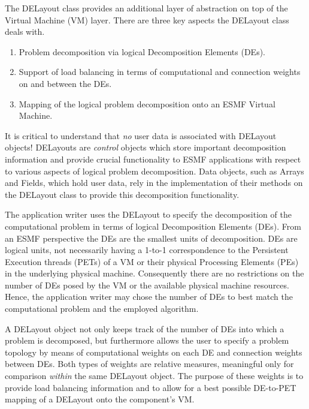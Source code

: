 
The DELayout class provides an additional layer of abstraction on top of the
Virtual Machine (VM) layer. There are three key aspects the DELayout class deals
with.

\begin{enumerate}

\item Problem decomposition via logical Decomposition Elements (DEs).

\item Support of load balancing in terms of computational and connection weights
on and between the DEs. 

\item Mapping of the logical problem decomposition onto an ESMF Virtual Machine.

\end{enumerate}

It is critical to understand that {\it no} user data is associated with DELayout
objects! DELayouts are {\it control} objects which store important decomposition
information and provide crucial functionality to ESMF applications with respect
to various aspects of logical problem decomposition. Data objects, such as
Arrays and Fields, which hold user data, rely in the implementation of their
methods on the DELayout class to provide this decomposition functionality.

The application writer uses the DELayout to specify the decomposition of the
computational problem in terms of logical Decomposition Elements (DEs). From an
ESMF perspective the DEs are the smallest units of decomposition. DEs are
logical units, not necessarily having a 1-to-1 correspondence to the Persistent
Execution threads (PETs) of a VM or their physical Processing Elements (PEs) in
the underlying physical machine. Consequently there are no restrictions on the
number of DEs posed by the VM or the available physical machine resources.
Hence, the application writer may chose the number of DEs to best match the
computational problem and the employed algorithm.

A DELayout object not only keeps track of the number of DEs into which a problem
is decomposed, but furthermore allows the user to specify a problem topology by
means of computational weights on each DE and connection weights between DEs.
Both types of weights are relative measures, meaningful only for comparison
{\it within} the same DELayout object. The purpose of these weights is to 
provide load balancing information and to allow for a best possible DE-to-PET 
mapping of a DELayout onto the component's VM.

